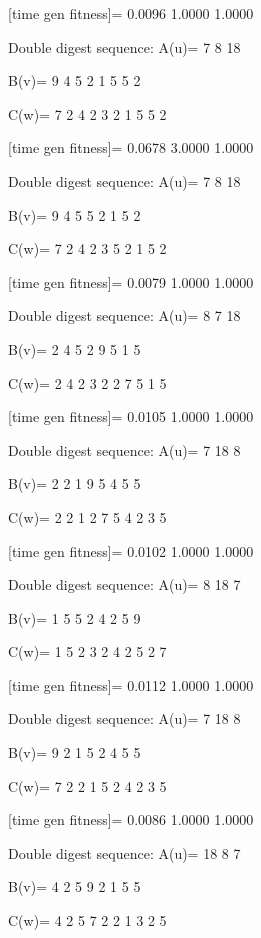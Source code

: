 [time gen fitness]=
    0.0096    1.0000    1.0000

Double digest sequence:
A(u)=
     7     8    18

B(v)=
     9     4     5     2     1     5     5     2

C(w)=
     7     2     4     2     3     2     1     5     5     2

[time gen fitness]=
    0.0678    3.0000    1.0000

Double digest sequence:
A(u)=
     7     8    18

B(v)=
     9     4     5     5     2     1     5     2

C(w)=
     7     2     4     2     3     5     2     1     5     2

[time gen fitness]=
    0.0079    1.0000    1.0000

Double digest sequence:
A(u)=
     8     7    18

B(v)=
     2     4     5     2     9     5     1     5

C(w)=
     2     4     2     3     2     2     7     5     1     5

[time gen fitness]=
    0.0105    1.0000    1.0000

Double digest sequence:
A(u)=
     7    18     8

B(v)=
     2     2     1     9     5     4     5     5

C(w)=
     2     2     1     2     7     5     4     2     3     5

[time gen fitness]=
    0.0102    1.0000    1.0000

Double digest sequence:
A(u)=
     8    18     7

B(v)=
     1     5     5     2     4     2     5     9

C(w)=
     1     5     2     3     2     4     2     5     2     7

[time gen fitness]=
    0.0112    1.0000    1.0000

Double digest sequence:
A(u)=
     7    18     8

B(v)=
     9     2     1     5     2     4     5     5

C(w)=
     7     2     2     1     5     2     4     2     3     5

[time gen fitness]=
    0.0086    1.0000    1.0000

Double digest sequence:
A(u)=
    18     8     7

B(v)=
     4     2     5     9     2     1     5     5

C(w)=
     4     2     5     7     2     2     1     3     2     5

